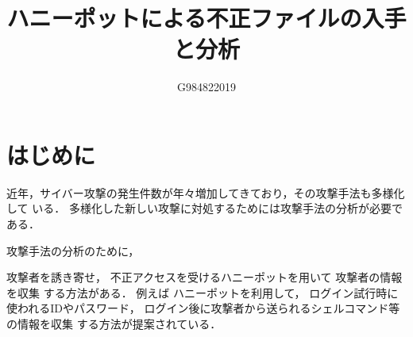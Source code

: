 \documentclass{entry}
\title{ハニーポットによる不正ファイルの入手と分析}
\author{G984822019}{吉村　直将}
\begin{document}
\maketitle

\section{はじめに}

近年，サイバー攻撃の発生件数が年々増加してきており，その攻撃手法も多様化して
いる．
多様化した新しい攻撃に対処するためには攻撃手法の分析が必要である．

攻撃手法の分析のために，

攻撃者を誘き寄せ，
不正アクセスを受けるハニーポットを用いて
攻撃者の情報を収集
する方法がある．
例えば
ハニーポットを利用して，
ログイン試行時に使われるIDやパスワード，
ログイン後に攻撃者から送られるシェルコマンド等の情報を収集
する方法が提案されている\cite{Entry}．




\end{document}
